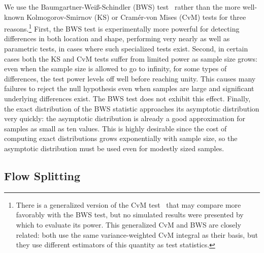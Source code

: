 \documentclass[conference]{IEEEtran}
\newcommand{\caps}[1]{{\small{#1}}}
\begin{document}
We use the Baumgartner-Wei\ss-Schindler (\caps{BWS}) test~\cite{BWS98} rather than the more well-known Kolmogorov-Smirnov (\caps{KS}) or Cram\'er-von Mises (\caps{CvM}) tests for three reasons.\footnote{There is a generalized version of the CvM test~\cite{Pettitt79} that may compare more favorably with the BWS test, but no simulated results were presented by which to evaluate its power. This generalized CvM and BWS are closely related: both use the same variance-weighted CvM integral as their basis, but they use different estimators of this quantity as test statistics.} First, the \caps{BWS} test is experimentally more powerful for detecting differences in both location and shape, performing very nearly as well as parametric tests, in cases where such specialized tests exist. Second, in certain cases both the \caps{KS} and \caps{CvM} tests suffer from limited power as sample size grows: even when the sample size is allowed to go to infinity, for some types of differences, the test power levels off well before reaching unity. This causes many failures to reject the null hypothesis even when samples are large and significant underlying differences exist. The \caps{BWS} test does not exhibit this effect. Finally, the exact distribution of the \caps{BWS} statistic approaches its asymptotic distribution very quickly: the asymptotic distribution is already a good approximation for samples as small as ten values. This is highly desirable since the cost of computing exact distributions grows exponentially with sample size, so the asymptotic distribution must be used even for modestly sized samples.


\subsection{Flow Splitting}
\end{document}
